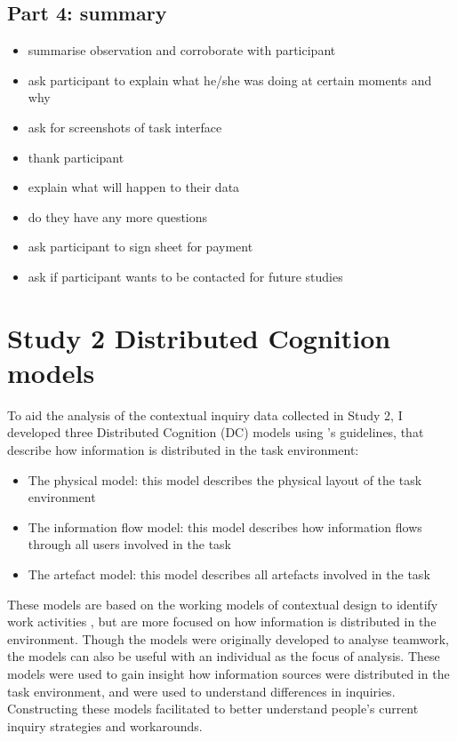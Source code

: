 \section{Part 4: summary}
\begin{itemize}
\item summarise observation and corroborate with participant
\item ask participant to explain what he/she was doing at certain moments and why
\item ask for screenshots of task interface
\item thank participant
\item explain what will happen to their data
\item do they have any more questions
\item ask participant to sign sheet for payment
\item ask if participant wants to be contacted for future studies
\end{itemize}

\chapter{Study 2 Distributed Cognition models}\label{ch:S2_Models}\label{ch:S2_Models}
To aid the analysis of the contextual inquiry data collected in Study 2, I developed three Distributed Cognition (DC) models using \citet{Furniss2006}'s guidelines, that describe how information is distributed in the task environment:

\begin{itemize}
\item 
The physical model: this model describes the physical layout of the task environment
\item 
The information flow model: this model describes how information flows through all users involved in the task
\item 
The artefact model: this model describes all artefacts involved in the task
\end{itemize}

These models are based on the working models of contextual design to identify work activities \citep{Holtzblatt2014}, but are more focused on how information is distributed in the environment. Though the models were originally developed to analyse teamwork, the models can also be useful with an individual as the focus of analysis. These models were used to gain insight how information sources were distributed in the task environment, and were used to understand differences in inquiries. Constructing these models facilitated to better understand people’s current inquiry strategies and workarounds.

